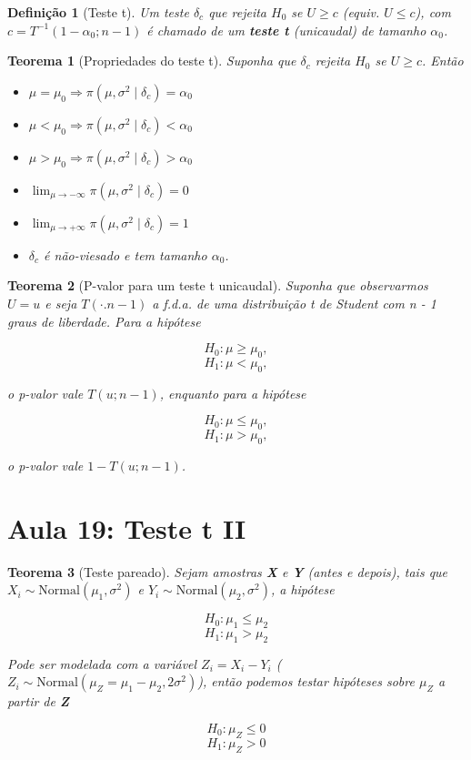 \documentclass{article}
\newtheorem{theorem}{Teorema}
\newtheorem{definition}{Definição}
\begin{document}
	\begin{definition}[Teste t]
		Um teste $\delta_c$ que rejeita $H_0$ se $U \geq c$ (equiv. $U \leq c$), com $c = T^{-1}(1 - \alpha_0; n - 1)$ é chamado de um \textbf{teste t} (unicaudal) de tamanho $\alpha_0$.
	\end{definition}
	
	\begin{theorem}[Propriedades do teste t]
		Suponha que $\delta_c$ rejeita $H_0$ se $U \geq c$. Então
		
		\begin{itemize}
			\item $\mu = \mu_0 \Longrightarrow \pi(\mu, \sigma^2 \mid \delta_c) = \alpha_0$
			
			\item $\mu < \mu_0 \Longrightarrow \pi(\mu, \sigma^2 \mid \delta_c) < \alpha_0$
			
			\item $\mu > \mu_0 \Longrightarrow \pi(\mu, \sigma^2 \mid \delta_c) > \alpha_0$
			
			\item $\lim_{\mu \rightarrow -\infty} \pi(\mu, \sigma^2 \mid \delta_c) = 0$
			
			\item $\lim_{\mu \rightarrow +\infty} \pi(\mu, \sigma^2 \mid \delta_c) = 1$
			
			\item $\delta_c$ é não-viesado e tem tamanho $\alpha_0$.
		\end{itemize}
	\end{theorem}
	
	\begin{theorem}[P-valor para um teste t unicaudal]
		Suponha que observarmos $U = u$ e seja $T(\cdot. n - 1)$ a f.d.a. de uma distribuição t de Student com n - 1 graus de liberdade. Para a hipótese
		
		$$H_0 : \mu \geq \mu_0,$$
		$$H_1 : \mu < \mu_0,$$
		
		o p-valor vale $T(u; n-1)$, enquanto para a hipótese
		
		$$H_0 : \mu \leq \mu_0,$$
		$$H_1 : \mu > \mu_0,$$
		
		o p-valor vale $1 - T(u; n-1)$.
	\end{theorem}
	
	\section*{Aula 19: Teste t II}\label{s19}
	\begin{theorem}[Teste pareado]
		Sejam amostras \textbf{X} e \textbf{Y} (antes e depois), tais que $X_i \sim \mathrm{Normal}(\mu_1, \sigma^2)$ e $Y_i \sim \mathrm{Normal}(\mu_2, \sigma^2)$, a hipótese
		
		$$H_0 : \mu_1 \leq \mu_2$$
		$$H_1 : \mu_1 > \mu_2$$
		
		Pode ser modelada com a variável $Z_i = X_i - Y_i$ ($Z_i \sim \mathrm{Normal}(\mu_Z = \mu_1 - \mu_2, 2 \sigma^2)$), então podemos testar hipóteses sobre $\mu_Z$ a partir de \textbf{Z}
		
		$$H_0 : \mu_Z \leq 0$$
		$$H_1 : \mu_Z > 0$$
	\end{theorem}
	
\end{document}
